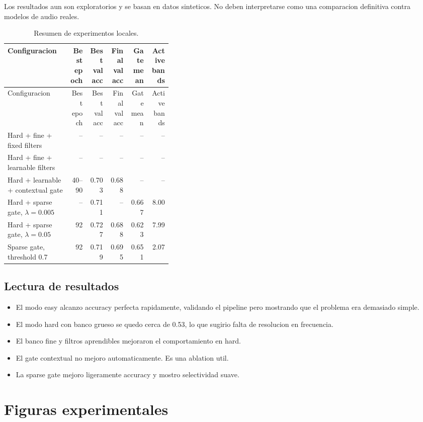 \documentclass[11pt,letterpaper]{article}
\begin{document}
Los resultados aun son exploratorios y se basan en datos sinteticos. No deben
interpretarse como una comparacion definitiva contra modelos de audio reales.

\begin{longtable}{p{0.38\linewidth}rrrrr}
\caption{Resumen de experimentos locales.}\\
\toprule
Configuracion & Best epoch & Best val acc & Final val acc & Gate mean & Active bands \\
\midrule
\endfirsthead
\toprule
Configuracion & Best epoch & Best val acc & Final val acc & Gate mean & Active bands \\
\midrule
\endhead
Hard + fine + fixed filters & -- & -- & -- & -- & -- \\
Hard + fine + learnable filters & -- & -- & -- & -- & -- \\
Hard + learnable + contextual gate & 40--90 & 0.703 & 0.688 & -- & -- \\
Hard + sparse gate, $\lambda=0.005$ & -- & 0.711 & -- & 0.667 & 8.00 \\
Hard + sparse gate, $\lambda=0.05$ & 92 & 0.727 & 0.688 & 0.623 & 7.99 \\
Sparse gate, threshold 0.7 & 92 & 0.719 & 0.695 & 0.651 & 2.07 \\
\bottomrule
\end{longtable}

\subsection{Lectura de resultados}

\begin{itemize}[leftmargin=*]
    \item El modo easy alcanzo accuracy perfecta rapidamente, validando el
    pipeline pero mostrando que el problema era demasiado simple.
    \item El modo hard con banco grueso se quedo cerca de 0.53, lo que sugirio
    falta de resolucion en frecuencia.
    \item El banco fine y filtros aprendibles mejoraron el comportamiento en
    hard.
    \item El gate contextual no mejoro automaticamente. Es una ablation util.
    \item La sparse gate mejoro ligeramente accuracy y mostro selectividad
    suave.
\end{itemize}

\section{Figuras experimentales}
\end{document}
